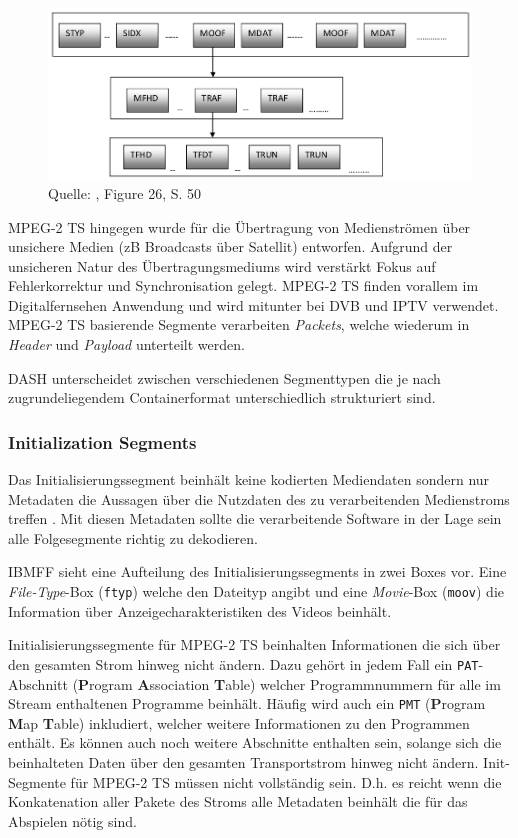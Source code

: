\documentclass[paper = a4, fontsize = 12pt, parskip = half]{scrartcl} %
\def\attr#1{\texttt{#1}}
\begin{document}
\begin{figure}[ht]
	\centering
	\includegraphics[width=12cm]{images/isobmff_boxes.png}
	\caption{Quelle: \cite{mazhar_compliance_2011}, Figure 26, S. 50}
	\label{ibmff_boxes}
\end{figure}

MPEG-2 TS hingegen wurde für die Übertragung von Medienströmen über unsichere Medien (zB Broadcasts über Satellit) entworfen. Aufgrund der unsicheren Natur des Übertragungsmediums wird verstärkt Fokus auf Fehlerkorrektur und Synchronisation gelegt. MPEG-2 TS finden vorallem im Digitalfernsehen Anwendung und wird mitunter bei DVB und IPTV verwendet. MPEG-2 TS basierende Segmente verarbeiten \textit{Packets}, welche wiederum in \textit{Header} und \textit{Payload} unterteilt werden.

DASH unterscheidet zwischen verschiedenen Segmenttypen die je nach zugrundeliegendem Containerformat unterschiedlich strukturiert sind.

\subsubsection{Initialization Segments}
Das Initialisierungssegment beinhält keine kodierten Mediendaten sondern nur Metadaten die Aussagen über die Nutzdaten des zu verarbeitenden Medienstroms treffen \cite{international_organization_for_standardization_isoiec_nodate}. Mit diesen Metadaten sollte die verarbeitende Software in der Lage sein alle Folgesegmente richtig zu dekodieren.

IBMFF sieht eine Aufteilung des Initialisierungssegments in zwei Boxes vor. Eine \textit{File-Type}-Box (\attr{ftyp}) welche den Dateityp angibt und eine \textit{Movie}-Box (\attr{moov}) die Information über Anzeigecharakteristiken des Videos beinhält.

Initialisierungssegmente für MPEG-2 TS beinhalten Informationen die sich über den gesamten Strom hinweg nicht ändern. Dazu gehört in jedem Fall ein \attr{PAT}-Abschnitt (\textbf{P}rogram \textbf{A}ssociation \textbf{T}able) welcher Programmnummern für alle im Stream enthaltenen Programme beinhält. Häufig wird auch ein \attr{PMT} (\textbf{P}rogram \textbf{M}ap \textbf{T}able) inkludiert, welcher weitere Informationen zu den Programmen enthält. Es können auch noch weitere Abschnitte enthalten sein, solange sich die beinhalteten Daten über den gesamten Transportstrom hinweg nicht ändern.
Init-Segmente für MPEG-2 TS müssen nicht vollständig sein. D.h. es reicht wenn die Konkatenation aller Pakete des Stroms alle Metadaten beinhält die für das Abspielen nötig sind.
\end{document}
